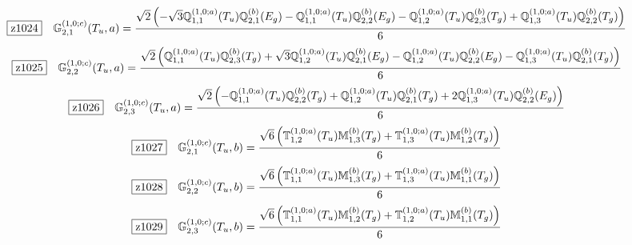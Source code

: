 \documentclass[fleqn,10pt,landscape]{jsarticle}
\begin{document}
\begin{dmath*}
\hspace*{3mm}\fbox{z1024}\quad \mathbb{G}_{2,1}^{(1,0;c)}(T_{u},a)=\frac{\sqrt{2} \left(- \sqrt{3} \mathbb{Q}_{1,1}^{(1,0;a)}(T_{u}) \mathbb{Q}_{2,1}^{(b)}(E_{g}) - \mathbb{Q}_{1,1}^{(1,0;a)}(T_{u}) \mathbb{Q}_{2,2}^{(b)}(E_{g}) - \mathbb{Q}_{1,2}^{(1,0;a)}(T_{u}) \mathbb{Q}_{2,3}^{(b)}(T_{g}) + \mathbb{Q}_{1,3}^{(1,0;a)}(T_{u}) \mathbb{Q}_{2,2}^{(b)}(T_{g})\right)}{6}
\end{dmath*}
\begin{dmath*}
\hspace*{3mm}\fbox{z1025}\quad \mathbb{G}_{2,2}^{(1,0;c)}(T_{u},a)=\frac{\sqrt{2} \left(\mathbb{Q}_{1,1}^{(1,0;a)}(T_{u}) \mathbb{Q}_{2,3}^{(b)}(T_{g}) + \sqrt{3} \mathbb{Q}_{1,2}^{(1,0;a)}(T_{u}) \mathbb{Q}_{2,1}^{(b)}(E_{g}) - \mathbb{Q}_{1,2}^{(1,0;a)}(T_{u}) \mathbb{Q}_{2,2}^{(b)}(E_{g}) - \mathbb{Q}_{1,3}^{(1,0;a)}(T_{u}) \mathbb{Q}_{2,1}^{(b)}(T_{g})\right)}{6}
\end{dmath*}
\begin{dmath*}
\hspace*{3mm}\fbox{z1026}\quad \mathbb{G}_{2,3}^{(1,0;c)}(T_{u},a)=\frac{\sqrt{2} \left(- \mathbb{Q}_{1,1}^{(1,0;a)}(T_{u}) \mathbb{Q}_{2,2}^{(b)}(T_{g}) + \mathbb{Q}_{1,2}^{(1,0;a)}(T_{u}) \mathbb{Q}_{2,1}^{(b)}(T_{g}) + 2 \mathbb{Q}_{1,3}^{(1,0;a)}(T_{u}) \mathbb{Q}_{2,2}^{(b)}(E_{g})\right)}{6}
\end{dmath*}
\begin{dmath*}
\hspace*{3mm}\fbox{z1027}\quad \mathbb{G}_{2,1}^{(1,0;c)}(T_{u},b)=\frac{\sqrt{6} \left(\mathbb{T}_{1,2}^{(1,0;a)}(T_{u}) \mathbb{M}_{1,3}^{(b)}(T_{g}) + \mathbb{T}_{1,3}^{(1,0;a)}(T_{u}) \mathbb{M}_{1,2}^{(b)}(T_{g})\right)}{6}
\end{dmath*}
\begin{dmath*}
\hspace*{3mm}\fbox{z1028}\quad \mathbb{G}_{2,2}^{(1,0;c)}(T_{u},b)=\frac{\sqrt{6} \left(\mathbb{T}_{1,1}^{(1,0;a)}(T_{u}) \mathbb{M}_{1,3}^{(b)}(T_{g}) + \mathbb{T}_{1,3}^{(1,0;a)}(T_{u}) \mathbb{M}_{1,1}^{(b)}(T_{g})\right)}{6}
\end{dmath*}
\begin{dmath*}
\hspace*{3mm}\fbox{z1029}\quad \mathbb{G}_{2,3}^{(1,0;c)}(T_{u},b)=\frac{\sqrt{6} \left(\mathbb{T}_{1,1}^{(1,0;a)}(T_{u}) \mathbb{M}_{1,2}^{(b)}(T_{g}) + \mathbb{T}_{1,2}^{(1,0;a)}(T_{u}) \mathbb{M}_{1,1}^{(b)}(T_{g})\right)}{6}
\end{dmath*}
\end{document}
